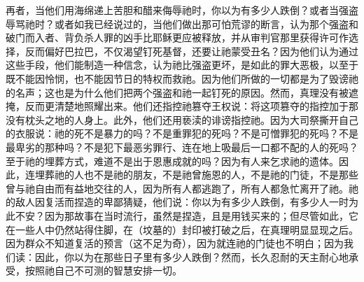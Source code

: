 再者，当他们用海绵递上苦胆和醋来侮辱祂时，你以为有多少人跌倒？或者当强盗辱骂祂时？或者如我已经说过的，当他们做出那可怕荒谬的断言，认为那个强盗和破门而入者、背负杀人罪的凶手比耶稣更应被释放，并从审判官那里获得许可作选择，反而偏好巴拉巴，不仅渴望钉死基督，还要让祂蒙受丑名？因为他们认为通过这些手段，他们能制造一种信念，认为祂比强盗更坏，是如此的罪大恶极，以至于既不能因怜悯，也不能因节日的特权而救祂。因为他们所做的一切都是为了毁谤祂的名声；这也是为什么他们把两个强盗和祂一起钉死的原因。然而，真理没有被遮掩，反而更清楚地照耀出来。\newline{}他们还指控祂篡夺王权说：将这项篡夺的指控加于那没有枕头之地的人身上。\newline{}此外，他们还用亵渎的诽谤指控祂。因为大司祭撕开自己的衣服说：\newline{}祂的死不是暴力的吗？不是重罪犯的死吗？不是可憎罪犯的死吗？不是最卑劣的那种吗？不是犯下最恶劣罪行、连在地上吸最后一口都不配的人的死吗？\newline{}至于祂的埋葬方式，难道不是出于恩惠成就的吗？因为有人来乞求祂的遗体。因此，连埋葬祂的人也不是祂的朋友，不是祂曾施恩的人，不是祂的门徒，不是那些曾与祂自由而有益地交往的人，因为所有人都逃跑了，所有人都急忙离开了祂。\newline{}祂的敌人因复活而捏造的卑鄙猜疑，他们说：你以为有多少人跌倒，有多少人一时为此不安？因为那故事在当时流行，虽然是捏造，且是用钱买来的；但尽管如此，它在一些人中仍然站得住脚，在（坟墓的）封印被打破之后，在真理明显显现之后。因为群众不知道复活的预言（这不足为奇），因为就连祂的门徒也不明白；因为我们读：\newline{}因此，你以为在那些日子里有多少人跌倒？然而，长久忍耐的天主耐心地承受，按照祂自己不可测的智慧安排一切。\par

